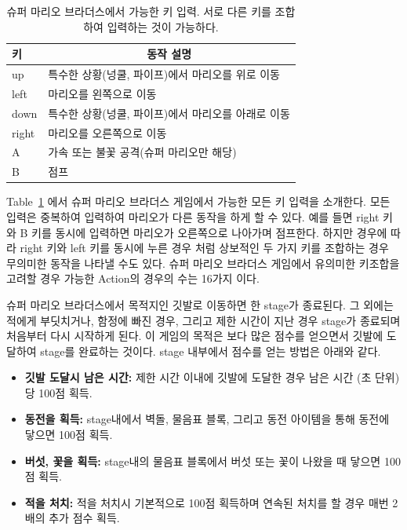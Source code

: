 \begin{table}[h]
	\caption {
		슈퍼 마리오 브라더스에서 가능한 키 입력. 서로 다른 키를 조합하여 입력하는 것이 가능하다.
	}
	\label{tab:mario:key}
\begin{tabular}{ll}
\toprule
키     & \multicolumn{1}{c}{동작 설명} \\
\midrule
up    & 특수한 상황(넝쿨, 파이프)에서 마리오를 위로 이동 \\
left  & 마리오를 왼쪽으로 이동 \\
down  & 특수한 상황(넝쿨, 파이프)에서 마리오를 아래로 이동 \\
right & 마리오를 오른쪽으로 이동 \\
A     & 가속 또는 불꽃 공격(슈퍼 마리오만 해당)\\
B     & 점프 \\
\bottomrule
\end{tabular}
\end{table}

Table~\ref{tab:mario:key} 에서 슈퍼 마리오 브라더스 게임에서 가능한 모든 키 입력을 소개한다.
모든 입력은 중복하여 입력하여 마리오가 다른 동작을 하게 할 수 있다.
예를 들면 right 키와 B 키를 동시에 입력하면 마리오가 오른쪽으로 나아가며 점프한다.
하지만 경우에 따라 right 키와 left 키를 동시에 누른 경우 처럼 상보적인 두 가지 키를 조합하는 경우 무의미한 동작을 나타낼 수도 있다.
슈퍼 마리오 브라더스 게임에서 유의미한 키조합을 고려할 경우 가능한 Action의 경우의 수는 16가지 이다.

슈퍼 마리오 브라더스에서 목적지인 깃발로 이동하면 한 stage가 종료된다.
그 외에는 적에게 부딧치거나, 함정에 빠진 경우, 그리고 제한 시간이 지난 경우 stage가 종료되며 처음부터 다시 시작하게 된다.
이 게임의 목적은 보다 많은 점수를 얻으면서 깃발에 도달하여 stage를 완료하는 것이다.
stage 내부에서 점수를 얻는 방법은 아래와 같다.
\begin{itemize}
	\item \textbf{깃발 도달시 남은 시간:}
		제한 시간 이내에 깃발에 도달한 경우 남은 시간 (초 단위)당 100점 획득.
	\item \textbf{동전을 획득:}
		stage내에서 벽돌, 물음표 블록, 그리고 동전 아이템을 통해 동전에 닿으면 100점 획득.
	\item \textbf{버섯, 꽃을 획득:}
		stage내의 물음표 블록에서 버섯 또는 꽃이 나왔을 때 닿으면 100점 획득.
	\item \textbf{적을 처치:}
		적을 처치시 기본적으로 100점 획득하며 연속된 처치를 할 경우 매번 2배의 추가 점수 획득.
\end{itemize}

